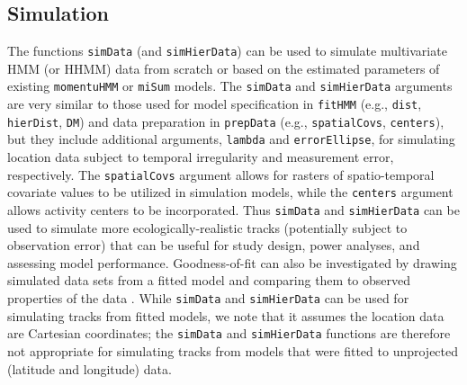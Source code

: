 \documentclass[12pt]{article}\usepackage[]{graphicx}\usepackage[]{xcolor}
\begin{document}
\subsection{Simulation}
The functions \verb|simData| (and \verb|simHierData|) can be used to simulate multivariate HMM (or HHMM) data from scratch or based on the estimated parameters of existing \verb|momentuHMM| or \verb|miSum| models.  The \verb|simData| and \verb|simHierData| arguments are very similar to those used for model specification in \verb|fitHMM| (e.g., \verb|dist|, \verb|hierDist|, \verb|DM|) and data preparation in \verb|prepData| (e.g., \verb|spatialCovs|, \verb|centers|), but they include additional arguments, \verb|lambda| and \verb|errorEllipse|, for simulating location data subject to temporal irregularity and measurement error, respectively. The \verb|spatialCovs| argument allows for rasters of spatio-temporal covariate values to be utilized in simulation models, while the \verb|centers| argument allows activity centers to be incorporated. Thus \verb|simData| and \verb|simHierData| can be used to simulate more ecologically-realistic tracks (potentially subject to observation error) that can be useful for study design, power analyses, and assessing model performance. Goodness-of-fit can also be investigated by drawing simulated data sets from a fitted model and comparing them to observed properties of the data \citep{MoralesEtAl2004}. While \verb|simData| and \verb|simHierData| can be used for simulating tracks from fitted models, we note that it assumes the location data are Cartesian coordinates; the \verb|simData| and \verb|simHierData| functions are therefore not appropriate for simulating tracks from models that were fitted to unprojected (latitude and longitude) data.
\end{document}

